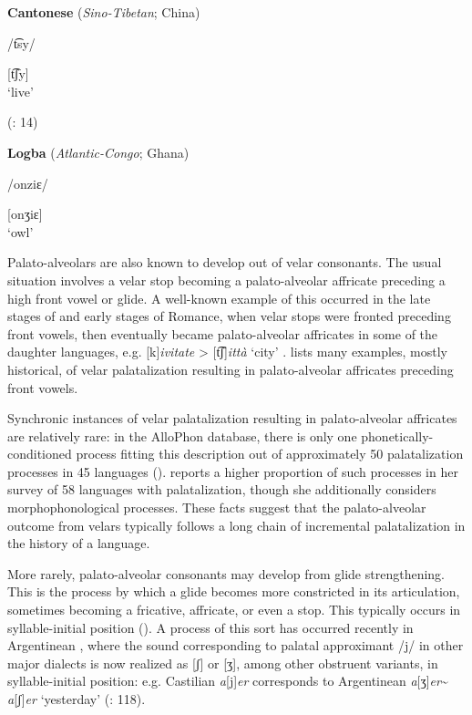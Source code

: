 \ea\label{ex:4.36}
  \textbf{Cantonese} (\textit{Sino-Tibetan}; China)

/t͡sy/

[t͡ʃy]\\
\glt ‘live’

(\citealt{MatthewsYip1994}: 14)
\z

\ea\label{ex:4.37}
  \textbf{Logba} (\textit{Atlantic-Congo}; Ghana)

/onziɛ/

[onʒiɛ]\\
\glt ‘owl’
\citep[18]{Dorvlo2008}
\z

  Palato-alveolars are also known to develop out of velar consonants. The usual situation involves a velar stop becoming a palato-alveolar affricate preceding a high front vowel or glide. A well-known example of this occurred in the late stages of  and early stages of Romance, when velar stops were fronted preceding front vowels, then eventually became palato-alveolar affricates in some of the daughter languages, e.g.  [k]\textit{ivitate} >  [t͡ʃ]\textit{ittà} ‘city’ \citep[113]{Posner1996}. \citet{Bhat1978} lists many examples, mostly historical, of velar palatalization resulting in palato-alveolar affricates preceding front vowels.

  Synchronic instances of velar palatalization resulting in palato-alveolar affricates are relatively rare: in the AlloPhon database, there is only one phonetically-conditioned process fitting this description out of approximately 50 palatalization processes in 45 languages (\citealt{BybeeEasterday2019}). \citet{Bateman2007} reports a higher proportion of such processes in her survey of 58 languages with palatalization, though she additionally considers morphophonological processes. These facts suggest that the palato-alveolar outcome from velars typically follows a long chain of incremental palatalization in the history of a language.

  More rarely, palato-alveolar consonants may develop from glide strengthening. This is the process by which a glide becomes more constricted in its articulation, sometimes becoming a fricative, affricate, or even a stop. This typically occurs in syllable-initial position (\citealt{BybeeEasterday2019}). A process of this sort has occurred recently in Argentinean , where the sound corresponding to palatal approximant /j/ in other major dialects is now realized as [ʃ] or [ʒ], among other obstruent variants, in syllable-initial position: e.g. Castilian  \textit{a}[j]\textit{er} corresponds to Argentinean  \textit{a}[ʒ]\textit{er}{\textasciitilde} \textit{a}[ʃ]\textit{er} ‘yesterday’ (\citealt{HarrisKaisse1999}: 118).

